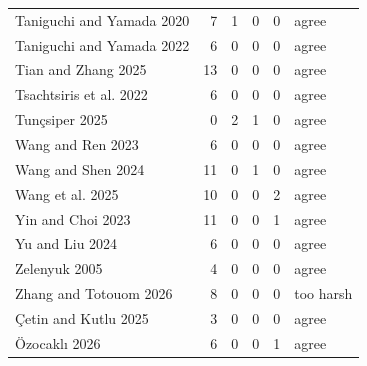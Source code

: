{\begin{longtable}{@{}p{4cm} r r r r l@{}}
Taniguchi and Yamada 2020 & 7 & 1 & 0 & 0 & agree \\
Taniguchi and Yamada 2022 & 6 & 0 & 0 & 0 & agree \\
Tian and Zhang 2025 & 13 & 0 & 0 & 0 & agree \\
Tsachtsiris et al. 2022 & 6 & 0 & 0 & 0 & agree \\
Tunçsiper 2025 & 0 & 2 & 1 & 0 & agree \\
Wang and Ren 2023 & 6 & 0 & 0 & 0 & agree \\
Wang and Shen 2024 & 11 & 0 & 1 & 0 & agree \\
Wang et al. 2025 & 10 & 0 & 0 & 2 & agree \\
Yin and Choi 2023 & 11 & 0 & 0 & 1 & agree \\
Yu and Liu 2024 & 6 & 0 & 0 & 0 & agree \\
Zelenyuk 2005 & 4 & 0 & 0 & 0 & agree \\
Zhang and Totouom 2026 & 8 & 0 & 0 & 0 & too harsh \\
Çetin and Kutlu 2025 & 3 & 0 & 0 & 0 & agree \\
Özocaklı 2026 & 6 & 0 & 0 & 1 & agree \\
\end{longtable}
}